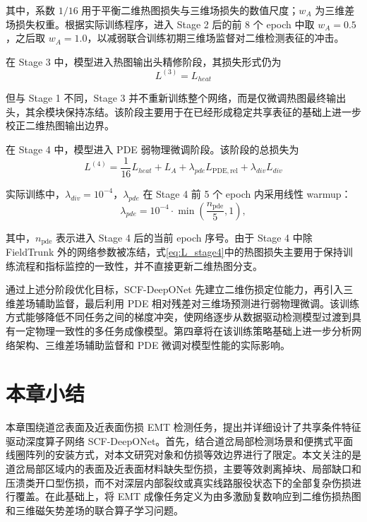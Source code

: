 其中，系数 $1/16$ 用于平衡二维热图损失与三维场损失的数值尺度；$w_A$ 为三维差场损失权重。根据实际训练程序，进入 Stage 2 后的前 8 个 epoch 中取 $w_A=0.5$，之后取 $w_A=1.0$，以减弱联合训练初期三维场监督对二维检测表征的冲击。

在 Stage 3 中，模型进入热图输出头精修阶段，其损失形式仍为
\begin{equation}
\label{eq:L_stage3}
L^{(3)}
=
L_{heat}
\end{equation}

但与 Stage 1 不同，Stage 3 并不重新训练整个网络，而是仅微调热图最终输出头，其余模块保持冻结。该阶段主要用于在已经形成稳定共享表征的基础上进一步校正二维热图输出边界。

在 Stage 4 中，模型进入 PDE 弱物理微调阶段。该阶段的总损失为
\begin{equation}
\label{eq:L_stage4}
L^{(4)}
=
\frac{1}{16}L_{heat}
+
L_A
+
\lambda_{pde}L_{\mathrm{PDE,rel}}
+
\lambda_{div}L_{div}
\end{equation}


实际训练中，$\lambda_{div}=10^{-4}$，$\lambda_{pde}$ 在 Stage 4 前 5 个 epoch 内采用线性 warmup\citep{goyal2017accurate}：
\begin{equation}
\label{eq:pde_warmup}
\lambda_{pde}
=
10^{-4}
\cdot
\min
\left(
\frac{n_{\mathrm{pde}}}{5},1
\right),
\end{equation}

其中，$n_{\mathrm{pde}}$ 表示进入 Stage 4 后的当前 epoch 序号。由于 Stage 4 中除 FieldTrunk 外的网络参数被冻结，式\eqref{eq:L_stage4}中的热图损失主要用于保持训练流程和指标监控的一致性，并不直接更新二维热图分支。

通过上述分阶段优化目标，SCF-DeepONet 先建立二维伤损定位能力，再引入三维差场辅助监督，最后利用 PDE 相对残差对三维场预测进行弱物理微调。该训练方式能够降低不同任务之间的梯度冲突，使网络逐步从数据驱动检测模型过渡到具有一定物理一致性的多任务成像模型。第四章将在该训练策略基础上进一步分析网络架构、三维差场辅助监督和 PDE 微调对模型性能的实际影响。

\section{本章小结}
\label{sec:chapter3_summary}

本章围绕道岔表面及近表面伤损 EMT 检测任务，提出并详细设计了共享条件特征驱动深度算子网络 SCF-DeepONet。首先，结合道岔局部检测场景和便携式平面线圈阵列的安装方式，对本文研究对象和仿损等效边界进行了限定。本文关注的是道岔局部区域内的表面及近表面材料缺失型伤损，主要等效剥离掉块、局部缺口和压溃类开口型伤损，而不对深层内部裂纹或真实线路服役状态下的全部复杂伤损进行覆盖。在此基础上，将 EMT 成像任务定义为由多激励复数响应到二维伤损热图和三维磁矢势差场的联合算子学习问题。


